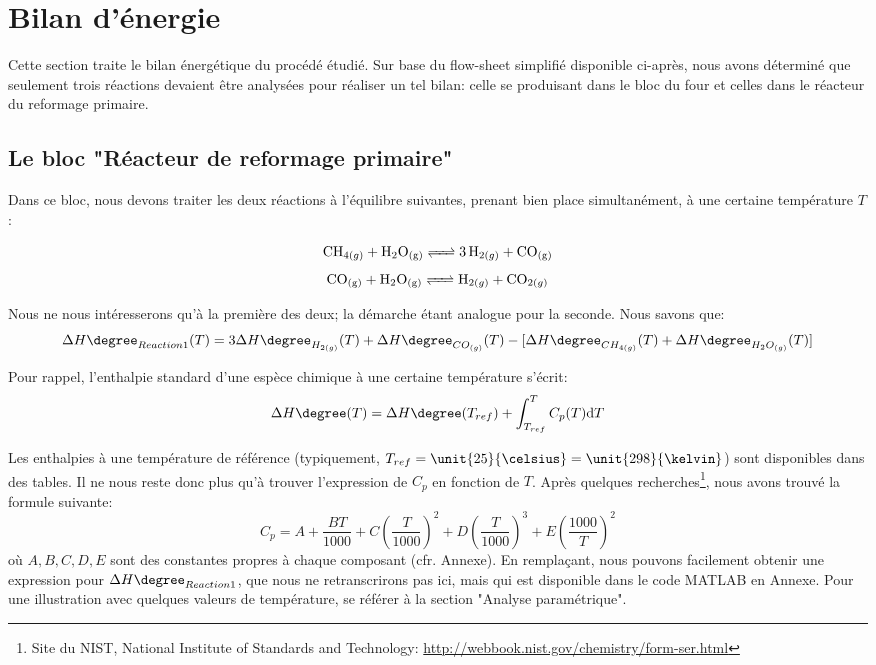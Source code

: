 \documentclass[11pt,a4paper]{report}
\author{Groupe 1246}
\begin{document}
\section*{Bilan d'énergie}

Cette section traite le bilan énergétique du procédé étudié.
Sur base du flow-sheet simplifié disponible ci-après, nous avons déterminé que seulement trois réactions
devaient être analysées pour réaliser un tel bilan: celle se produisant dans le bloc du four et celles dans 
le réacteur du reformage primaire.

\subsection*{Le bloc "Réacteur de reformage primaire"}

Dans ce bloc, nous devons traiter les deux réactions à l'équilibre suivantes, prenant bien place simultanément, à une certaine température $T$:

\begin{equation}\label{eq:Reaction1}
\ce{CH_{4(g)} + H_{2}O_{(g)} <=> 3H_{2(g)} + CO_{(g)}}
\end{equation}
\begin{equation}\label{eq:Reaction2} {\ce{CO_{(g)} + H_{2}O_{(g)} <=>  H_{2(g)} + CO_{2(g)}}}
\end{equation}


\bigbreak
Nous ne nous intéresserons qu'à la première des deux; la démarche étant analogue pour la seconde. Nous savons que:
$$\Delta H\degree_{Reaction1}(T)=3\Delta H\degree_{H_{2(g)}}(T) + \Delta H\degree_{CO_{(g)}}(T) -
\lbrack\Delta H\degree_{CH_{4(g)}}(T) + \Delta H\degree_{H_{2}O_{(g)}}(T)\rbrack$$

Pour rappel, l'enthalpie standard d'une espèce chimique à une certaine température s'écrit: \begin{equation}\label{eq:deltaH}
\Delta H\degree(T)=\Delta H\degree(T_{ref})  + \displaystyle \int_{T_{ref}}^{T} C_{p}(T) \mathrm{d}T
\end{equation}


Les enthalpies à une température de référence (typiquement, $T_{ref}=\unit{25}{\celsius}=\unit{298}{\kelvin}$) sont disponibles dans des tables. Il ne nous reste donc plus
qu'à trouver l'expression de $C_p$ en fonction de $T$.
Après quelques recherches\footnote{Site du \textsc{NIST}, National Institute of Standards and Technology:
\url{http://webbook.nist.gov/chemistry/form-ser.html}}, nous avons trouvé la formule suivante: \begin{equation}\label{eqref:capacite}
C_p=A+\dfrac{BT}{1000}+C\left(\dfrac{T}{1000}\right)^2+D\left(\dfrac{T}{1000}\right)^3+E\left(\dfrac{1000}{T}\right)^2
\end{equation} où $A,B,C,D,E$ sont des constantes propres à chaque composant (cfr. Annexe).
En remplaçant, nous pouvons facilement obtenir une expression pour $\Delta H\degree_{Reaction1}$, que nous ne retranscrirons pas
ici, mais qui est disponible dans le code \textsc{MATLAB} en Annexe. Pour une illustration avec quelques valeurs de 
température, se référer à la section "Analyse paramétrique".
\end{document}
